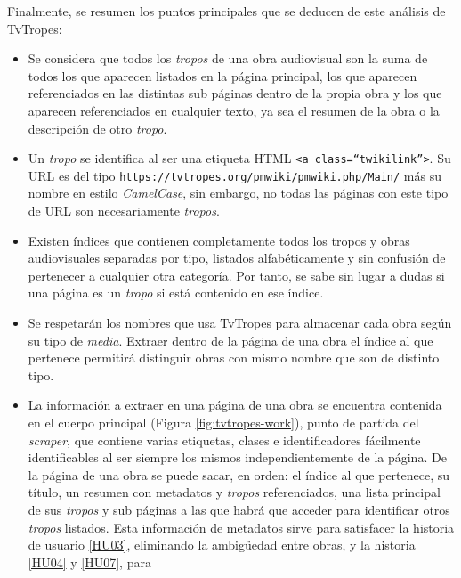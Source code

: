 Finalmente, se resumen los puntos principales que se deducen de este análisis de
TvTropes:
\begin{itemize}
    \item Se considera que todos los \textit{tropos} de una obra audiovisual son
    la suma de todos los que aparecen listados en la página principal, los que
    aparecen referenciados en las distintas sub páginas dentro de la propia obra
    y los que aparecen referenciados en cualquier texto, ya sea el resumen de la
    obra o la descripción de otro \textit{tropo}.
    \item Un \textit{tropo} se identifica al ser una etiqueta HTML \texttt{<a
    class=``twikilink''>}. Su URL es del tipo
    \texttt{https://tvtropes.org/pmwiki/pmwiki.php/Main/} más su nombre en
    estilo \textit{CamelCase}, sin embargo, no todas las páginas con este tipo
    de URL son necesariamente \textit{tropos}.
    \item Existen índices que contienen completamente todos los tropos y obras
    audiovisuales separadas por tipo, listados alfabéticamente y sin confusión
    de pertenecer a cualquier otra categoría. Por tanto, se sabe sin lugar a
    dudas si una página es un \textit{tropo} si está contenido en ese índice.
    \item Se respetarán los nombres que usa TvTropes para almacenar cada obra
    según su tipo de \textit{media}. Extraer dentro de la página de una obra el
    índice al que pertenece permitirá distinguir obras con mismo nombre que son
    de distinto tipo.
    \item La información a extraer en una página de una obra se encuentra
    contenida en el cuerpo principal (Figura \ref{fig:tvtropes-work}), punto de
    partida del \textit{scraper}, que contiene varias etiquetas, clases e
    identificadores fácilmente identificables al ser siempre los mismos
    independientemente de la página. De la página de una obra se puede sacar, en
    orden: el índice al que pertenece, su título, un resumen con metadatos y
    \textit{tropos} referenciados, una lista principal de sus \textit{tropos} y
    sub páginas a las que habrá que acceder para identificar otros
    \textit{tropos} listados. Esta información de metadatos sirve para
    satisfacer la historia de usuario
    \href{https://github.com/jlgallego99/TropesToGo/issues/8}{[HU03]},
    eliminando la ambigüedad entre obras, y la historia
    \href{https://github.com/jlgallego99/TropesToGo/issues/9}{[HU04]} y
    \href{https://github.com/jlgallego99/TropesToGo/issues/46}{[HU07]}, para

\end{itemize}
